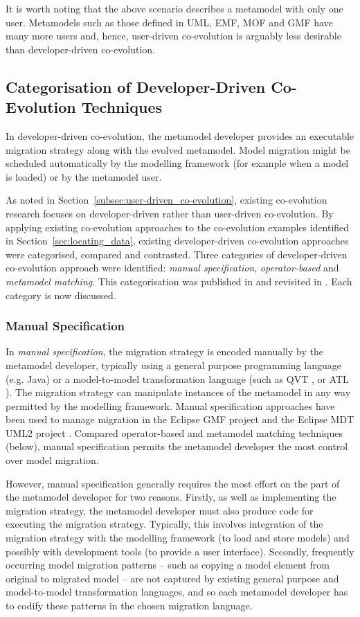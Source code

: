 It is worth noting that the above scenario describes a metamodel with only one user. Metamodels such as those defined in UML, EMF, MOF and GMF have many more users and, hence, user-driven co-evolution is arguably less desirable than developer-driven co-evolution. 


\subsection{Categorisation of Developer-Driven Co-Evolution Techniques}
\label{subsec:co-evolution_categorisation}
In developer-driven co-evolution, the metamodel developer provides an executable migration strategy along with the evolved metamodel. Model migration might be scheduled automatically by the modelling framework (for example when a model is loaded) or by the metamodel user.

As noted in Section~\ref{subsec:user-driven_co-evolution}, existing co-evolution research focuses on developer-driven rather than user-driven co-evolution. By applying existing co-evolution approaches to the co-evolution examples identified in Section~\ref{sec:locating_data}, existing developer-driven co-evolution approaches were categorised, compared and contrasted. Three categories of developer-driven co-evolution approach were identified: \emph{manual specification}, \emph{operator-based} and \emph{metamodel matching}. This categorisation was published in \cite{rose09analysis} and revisited in \cite{rose10flock}. Each category is now discussed.

\subsubsection{Manual Specification}
In \emph{manual specification}, the migration strategy is encoded manually by the metamodel developer, typically using a general purpose programming language (e.g. Java) or a model-to-model transformation language (such as QVT \cite{qvt}, or ATL \cite{jouault05transforming}). The migration strategy can manipulate instances of the metamodel in any way permitted by the modelling framework. Manual specification approaches have been used to manage migration in the Eclipse GMF project \cite{gronback06gmf} and the Eclipse MDT UML2 project \cite{mdt_uml2}. Compared operator-based and metamodel matching techniques (below), manual specification permits the metamodel developer the most control over model migration.

However, manual specification generally requires the most effort on the part of the metamodel developer for two reasons. Firstly, as well as implementing the migration strategy, the metamodel developer must also produce code for executing the migration strategy. Typically, this involves integration of the migration strategy with the modelling framework (to load and store models) and possibly with development tools (to provide a user interface). Secondly, frequently occurring model migration patterns -- such as copying a model element from original to migrated model -- are not captured by existing general purpose and model-to-model transformation languages, and so each metamodel developer has to codify these patterns in the chosen migration language.

